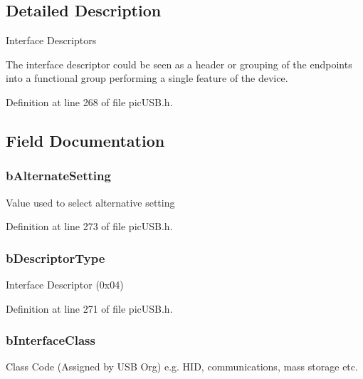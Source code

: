 \subsection{Detailed Description}
Interface Descriptors\par
 The interface descriptor could be seen as a header or grouping of the endpoints into a functional group performing a single feature of the device. 

Definition at line 268 of file pic\-U\-S\-B.\-h.



\subsection{Field Documentation}
\hypertarget{struct_u_s_b___interface___descriptor_ab7c4c36aed976d99c515a3373faecf4e}{
\subsubsection[{b\-Alternate\-Setting}]{ b\-Alternate\-Setting}}\label{struct_u_s_b___interface___descriptor_ab7c4c36aed976d99c515a3373faecf4e}
Value used to select alternative setting 

Definition at line 273 of file pic\-U\-S\-B.\-h.

\hypertarget{struct_u_s_b___interface___descriptor_af6d6c7e334878414c973fc10e54cfb4e}{
\subsubsection[{b\-Descriptor\-Type}]{ b\-Descriptor\-Type}}\label{struct_u_s_b___interface___descriptor_af6d6c7e334878414c973fc10e54cfb4e}
Interface Descriptor (0x04) 

Definition at line 271 of file pic\-U\-S\-B.\-h.

\hypertarget{struct_u_s_b___interface___descriptor_a37040f8cc1429b370a6c7878d518dba0}{
\subsubsection[{b\-Interface\-Class}]{ b\-Interface\-Class}}\label{struct_u_s_b___interface___descriptor_a37040f8cc1429b370a6c7878d518dba0}
Class Code (Assigned by U\-S\-B Org) e.\-g. H\-I\-D, communications, mass storage etc. 

